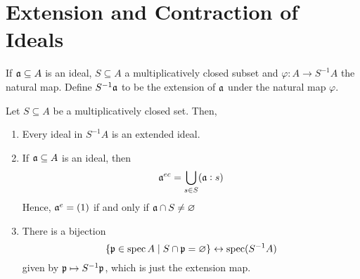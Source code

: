 \section{Extension and Contraction of Ideals}

\begin{definition}
    If $\mathfrak a\subseteq A$ is an ideal, $S\subseteq A$ a multiplicatively closed subset and $\varphi: A\to S^{-1}A$ the natural map. Define $S^{-1}\mathfrak a$ to be the extension of $\mathfrak a$ under the natural map $\varphi$.
\end{definition}

\begin{theorem}
    Let $S\subseteq A$ be a multiplicatively closed set. Then, 
    \begin{enumerate}[label=(\alph*)]
        \item Every ideal in $S^{-1}A$ is an extended ideal. 
        \item If $\mathfrak a\subseteq A$ is an ideal, then 
        \begin{equation*}
            \mathfrak a^{ec} = \bigcup_{s\in S}(\mathfrak a: s)
        \end{equation*}
        Hence, $\mathfrak a^e = (1)$ if and only if $\mathfrak a\cap S\ne\varnothing$ 
        \item There is a bijection 
        \begin{equation*}
            \{\mathfrak p\in\operatorname{spec} A\mid S\cap\mathfrak p = \varnothing\}\leftrightarrow\operatorname{spec}(S^{-1}A)
        \end{equation*}
        given by $\mathfrak p\mapsto S^{-1}\mathfrak p$, which is just the extension map.
    \end{enumerate}
\end{theorem}
